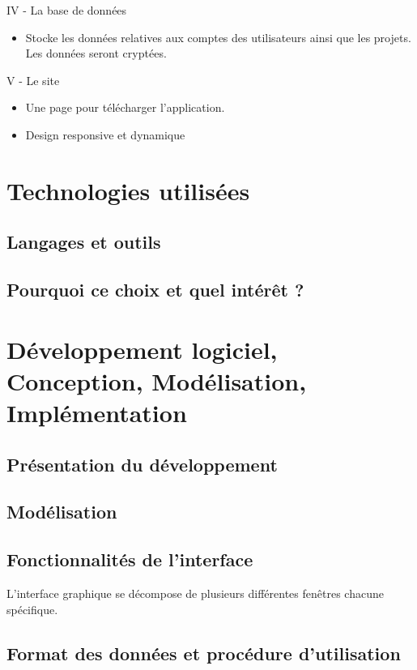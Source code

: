 \documentclass{report}
\begin{document}
IV - La base de données
\begin{itemize}
    \item Stocke les données relatives aux comptes des utilisateurs ainsi que les projets.
Les données seront cryptées.
\end{itemize}
V - Le site
\begin{itemize}
    \item Une page pour télécharger l’application.
    \item Design responsive et dynamique
\end{itemize}

\chapter{Technologies utilisées}
\section{Langages et outils}
\section{Pourquoi ce choix et quel intérêt ?} %

\chapter{Développement logiciel, Conception, Modélisation, Implémentation}
\section{Présentation du développement}
\section{Modélisation} %
\section{Fonctionnalités de l'interface}

L'interface graphique se décompose de plusieurs différentes fenêtres chacune spécifique.

\section{Format des données et procédure d'utilisation} %
\end{document}
